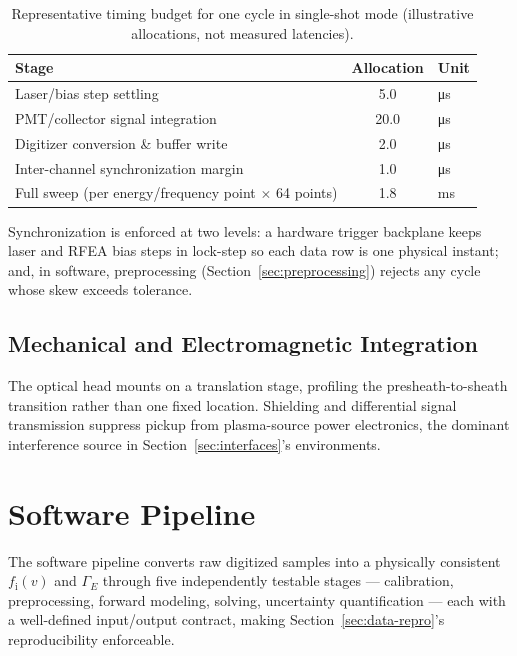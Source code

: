 \begin{table}[htbp]
\centering
\caption{Representative timing budget for one cycle in single-shot mode (illustrative allocations, not measured latencies).}
\label{tab:timing-budget}
\begin{tabular}{@{}lS[table-format=3.1]l@{}}
\toprule
Stage & {Allocation} & Unit \\
\midrule
Laser/bias step settling & 5.0 & \si{\micro\second} \\
PMT/collector signal integration & 20.0 & \si{\micro\second} \\
Digitizer conversion \& buffer write & 2.0 & \si{\micro\second} \\
Inter-channel synchronization margin & 1.0 & \si{\micro\second} \\
Full sweep (per energy/frequency point $\times$ 64 points) & 1.8 & \si{\milli\second} \\
\bottomrule
\end{tabular}
\end{table}

Synchronization is enforced at two levels: a hardware trigger backplane keeps laser and RFEA bias steps in lock-step so each data row is one physical instant; and, in software, preprocessing (Section~\ref{sec:preprocessing}) rejects any cycle whose skew exceeds tolerance.

\subsection{Mechanical and Electromagnetic Integration}

The optical head mounts on a translation stage, profiling the presheath-to-sheath transition rather than one fixed location. Shielding and differential signal transmission suppress pickup from plasma-source power electronics, the dominant interference source in Section~\ref{sec:interfaces}'s environments.

\section{Software Pipeline}
\label{sec:pipeline}

The software pipeline converts raw digitized samples into a physically consistent $f_{\mathrm{i}}(v)$ and $\Gamma_{E}$ through five independently testable stages — calibration, preprocessing, forward modeling, solving, uncertainty quantification — each with a well-defined input/output contract, making Section~\ref{sec:data-repro}'s reproducibility enforceable.

